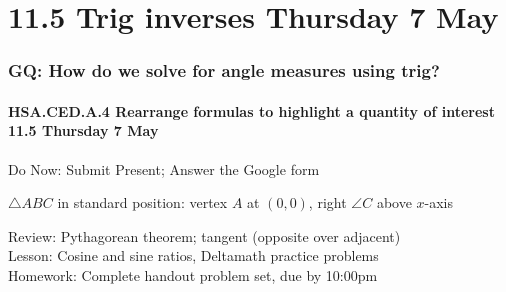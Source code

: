 \documentclass{beamer}
\begin{document}
\section{11.5 Trig inverses Thursday 7 May} 
\frame
{
  \frametitle{GQ: How do we solve for angle measures using trig?}
  \framesubtitle{HSA.CED.A.4 Rearrange formulas to highlight a quantity of interest \hfill \alert{11.5 Thursday 7 May}}

  \begin{block}{Do Now: Submit Present; Answer the Google form} \vspace{0.5cm}
    \begin{multicols}{2}
      $\triangle ABC$ in standard position: vertex $A$ at $(0,0)$, right $\angle C$ above $x$-axis
  \end{multicols}
    \end{block}
    Review: Pythagorean theorem; tangent (opposite over adjacent)\\[0.25cm]
    Lesson: Cosine and sine ratios, 
    Deltamath practice problems \\[0.25cm]
    Homework: Complete handout problem set, due by 10:00pm}
\end{document}
